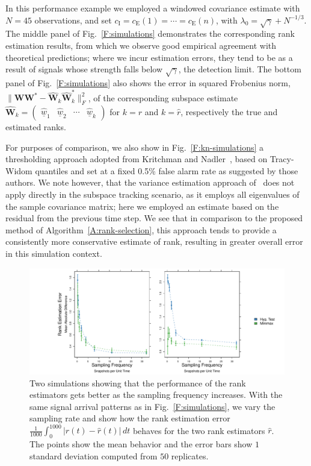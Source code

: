 \documentclass[final]{IEEEtran} %
\newcommand{\vectorsymbol}{\underline}
\newcommand{\matrixsymbol}{\boldsymbol}
\newcommand{\mW}{\matrixsymbol{W}}
\newcommand{\mhW}{\widehat{\matrixsymbol{W}}}
\newcommand{\vhw}{\hat{\vectorsymbol{w}}}
\newcommand{\ce}{c_\text{E}}
\newcommand{\ci}{c_\text{I}}
\begin{document}
In this performance example we employed a windowed covariance estimate with $N = 45$ observations, and set $\ci = \ce(1) = \cdots = \ce(n)$, with $\lambda_0 = \sqrt{\gamma} + N^{-1/3}$.  The middle panel of Fig.~\ref{F:simulations} demonstrates the corresponding rank estimation results, from which we observe good empirical agreement with theoretical predictions; where we incur estimation errors, they tend to be as a result of signals whose strength falls below $\sqrt{\gamma}$, the detection limit.  The bottom panel of Fig.~\ref{F:simulations} also shows the error in squared Frobenius norm, $\| \mW \mW^\ast - \mhW_k \mhW^\ast_k \|_F^2$, of the corresponding subspace estimate
\(
    \mhW_k
    =
    \begin{pmatrix}
        \vhw_1 & \vhw_2 & \cdots & \vhw_k
    \end{pmatrix}
\)
for $k = r$ and $k = \hat r$, respectively the true and estimated ranks.

For purposes of comparison, we also show in Fig.~\ref{F:kn-simulations} a thresholding approach adopted from Kritchman and Nadler~\cite{kritchman2008dnc}, based on Tracy-Widom quantiles and set at a fixed 0.5\% false alarm rate as suggested by those authors.  We note however, that the variance estimation approach of~\cite{kritchman2008dnc} does not apply directly in the subspace tracking scenario, as it employs all eigenvalues of the sample covariance matrix; here we employed an estimate based on the residual from the previous time step.  We see that in comparison to the proposed method of Algorithm~\ref{A:rank-selection}, this approach tends to provide a consistently more conservative estimate of rank, resulting in greater overall error in this simulation context.

\begin{figure}
    \centering
    \includegraphics[width=2.1\columnwidth]{plots/consistency-sim}
    \caption{Two simulations showing that the performance of the rank estimators gets better as the sampling frequency increases.  With the same signal arrival patterns as in Fig.~\ref{F:simulations}, we vary the sampling rate and show how the rank estimation error $\frac{1}{1000} \int_0^{1000} |r(t) - \hat r(t)| \, dt$ behaves for the two rank estimators $\hat r$.  The points show the mean behavior and the error bars show $1$ standard deviation computed from $50$ replicates.}\label{F:consistency-sim} 
  \end{figure}
\end{document}
